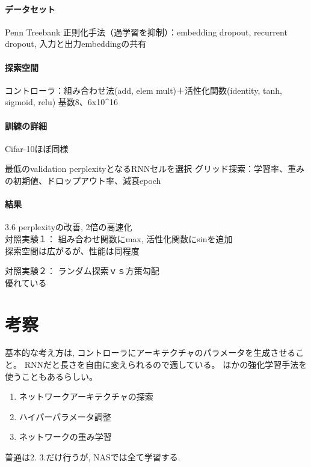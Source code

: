 \documentclass[twocolumn]{jarticle}     %
\begin{document}
\paragraph{データセット}
Penn Treebank
正則化手法（過学習を抑制）：embedding dropout, recurrent dropout, 入力と出力embeddingの共有

\paragraph{探索空間}
コントローラ：組み合わせ法(add, elem mult)＋活性化関数(identity, tanh, sigmoid, relu)
基数8、6x10^16

\paragraph{訓練の詳細}
Cifar-10ほぼ同様

最低のvalidation perplexityとなるRNNセルを選択
グリッド探索：学習率、重みの初期値、ドロップアウト率、減衰epoch

\paragraph{結果}
3.6 perplexityの改善, 2倍の高速化\\

対照実験１：
組み合わせ関数にmax, 活性化関数にsinを追加\\
探索空間は広がるが、性能は同程度

対照実験２：
ランダム探索ｖｓ方策勾配\\
優れている

\section{考察}
基本的な考え方は, コントローラにアーキテクチャのパラメータを生成させること。
RNNだと長さを自由に変えられるので適している。
ほかの強化学習手法を使うこともあるらしい。
\begin{enumerate}
  \item ネットワークアーキテクチャの探索
  \item ハイパーパラメータ調整
  \item ネットワークの重み学習
\end{enumerate}
普通は2. 3.だけ行うが, NASでは全て学習する.
\end{document}
